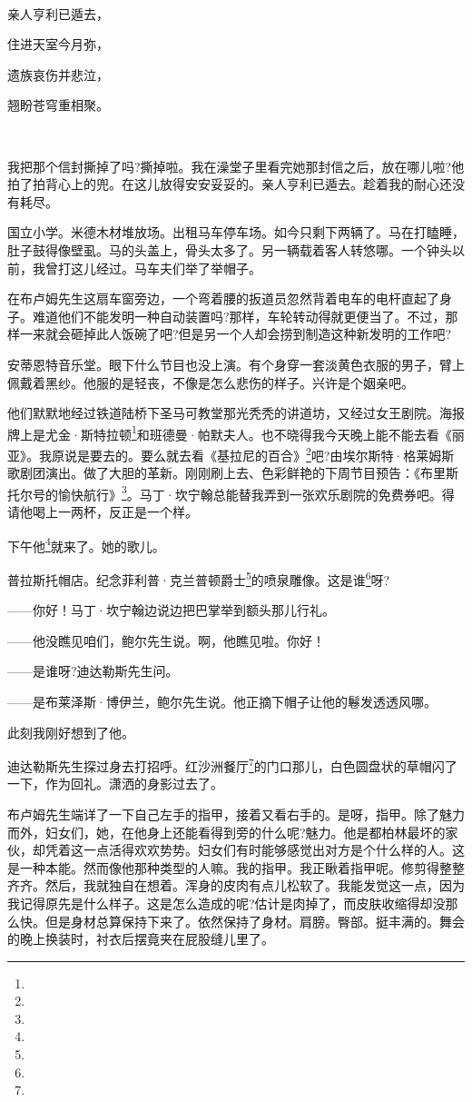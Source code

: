\par  
\par 亲人亨利已遁去，
\par 住进天室今月弥，
\par 遗族哀伤并悲泣，
\par 翘盼苍穹重相聚。
\par  
\par 我把那个信封撕掉了吗?撕掉啦。我在澡堂子里看完她那封信之后，放在哪儿啦?他拍了拍背心上的兜。在这儿放得安安妥妥的。亲人亨利已遁去。趁着我的耐心还没有耗尽。
\par 国立小学。米德木材堆放场。出租马车停车场。如今只剩下两辆了。马在打瞌睡，肚子鼓得像壁虱。马的头盖上，骨头太多了。另一辆载着客人转悠哪。一个钟头以前，我曾打这儿经过。马车夫们举了举帽子。
\par 在布卢姆先生这扇车窗旁边，一个弯着腰的扳道员忽然背着电车的电杆直起了身子。难道他们不能发明一种自动装置吗?那样，车轮转动得就更便当了。不过，那样一来就会砸掉此人饭碗了吧?但是另一个人却会捞到制造这种新发明的工作吧?
\par 安蒂恩特音乐堂。眼下什么节目也没上演。有个身穿一套淡黄色衣服的男子，臂上佩戴着黑纱。他服的是轻丧，不像是怎么悲伤的样子。兴许是个姻亲吧。
\par 他们默默地经过铁道陆桥下圣马可教堂那光秃秃的讲道坊，又经过女王剧院。海报牌上是尤金·斯特拉顿\footnote{}和班德曼·帕默夫人。也不晓得我今天晚上能不能去看《丽亚》。我原说是要去的。要么就去看《基拉尼的百合》\footnote{}吧?由埃尔斯特·格莱姆斯歌剧团演出。做了大胆的革新。刚刚刷上去、色彩鲜艳的下周节目预告：《布里斯托尔号的愉快航行》\footnote{}。马丁·坎宁翰总能替我弄到一张欢乐剧院的免费券吧。得请他喝上一两杯，反正是一个样。
\par 下午他\footnote{}就来了。她的歌儿。
\par 普拉斯托帽店。纪念菲利普·克兰普顿爵士\footnote{}的喷泉雕像。这是谁\footnote{}呀?
\par ——你好！马丁·坎宁翰边说边把巴掌举到额头那儿行礼。
\par ——他没瞧见咱们，鲍尔先生说。啊，他瞧见啦。你好！
\par ——是谁呀?迪达勒斯先生问。
\par ——是布莱泽斯·博伊兰，鲍尔先生说。他正摘下帽子让他的鬈发透透风哪。
\par 此刻我刚好想到了他。
\par 迪达勒斯先生探过身去打招呼。红沙洲餐厅\footnote{}的门口那儿，白色圆盘状的草帽闪了一下，作为回礼。潇洒的身影过去了。
\par 布卢姆先生端详了一下自己左手的指甲，接着又看右手的。是呀，指甲。除了魅力而外，妇女们，她，在他身上还能看得到旁的什么呢?魅力。他是都柏林最坏的家伙，却凭着这一点活得欢欢势势。妇女们有时能够感觉出对方是个什么样的人。这是一种本能。然而像他那种类型的人嘛。我的指甲。我正瞅着指甲呢。修剪得整整齐齐。然后，我就独自在想着。浑身的皮肉有点儿松软了。我能发觉这一点，因为我记得原先是什么样子。这是怎么造成的呢?估计是肉掉了，而皮肤收缩得却没那么快。但是身材总算保持下来了。依然保持了身材。肩膀。臀部。挺丰满的。舞会的晚上换装时，衬衣后摆竟夹在屁股缝儿里了。

